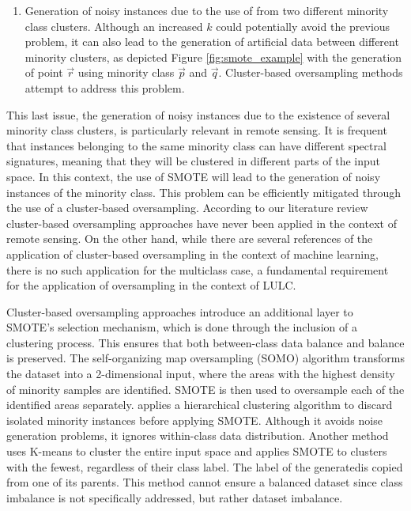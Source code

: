 \documentclass[remotesensing,article,submit,moreauthors,pdftex]{Definitions/mdpi}
\begin{document}
\begin{paracol}{2}
\begin{enumerate}
    \item Generation of noisy instances due to the use of from two different minority class clusters.
        Although an increased $k$ could potentially avoid the previous
        problem, it can also lead to the generation of artificial data between
        different minority clusters, as depicted Figure
        \ref{fig:smote_example} with the generation of point
        $\overrightarrow{r}$ using minority class $\overrightarrow{p}$ and $\overrightarrow{q}$.
        Cluster-based oversampling methods attempt to address this problem. 
\end{enumerate}

This last issue, the generation of noisy instances due to the existence of
several minority class clusters, is particularly relevant in remote sensing.
It is frequent that instances belonging to the same minority class can have
different spectral signatures, meaning that they will be clustered in
different parts of the input space. In this context, the use of SMOTE will
lead to the generation of noisy instances of the minority class. This problem
can be efficiently mitigated through the use of a cluster-based oversampling.
According to our literature review cluster-based oversampling approaches have
never been applied in the context of remote sensing. On the other hand, while
there are several references of the application of cluster-based oversampling
in the context of machine learning, there is no such  application
for the multiclass case, a fundamental requirement for the application of
oversampling in the context of LULC. 

Cluster-based oversampling approaches introduce an additional layer to SMOTE's
selection mechanism, which is done through the inclusion of a clustering
process. This ensures that both between-class data balance and
 balance is preserved. The
self-organizing map oversampling (SOMO) \cite{Douzas2017} algorithm transforms
the dataset into a 2-dimensional input, where the areas with the highest
density of minority samples are identified.  SMOTE is then used to oversample
each of the identified areas separately.   \cite{Ma2017} applies a hierarchical clustering
algorithm to discard isolated minority instances before applying SMOTE.
Although it avoids noise generation problems, it ignores within-class data
distribution. Another method \cite{Santos2015} uses K-means to cluster the
entire input space and applies SMOTE to clusters with the fewest, regardless of their class label. The label of the
generatedis copied from one of its parents.
This method cannot ensure a balanced dataset since class imbalance is not
specifically addressed, but rather dataset imbalance.


\end{paracol}
\end{document}
